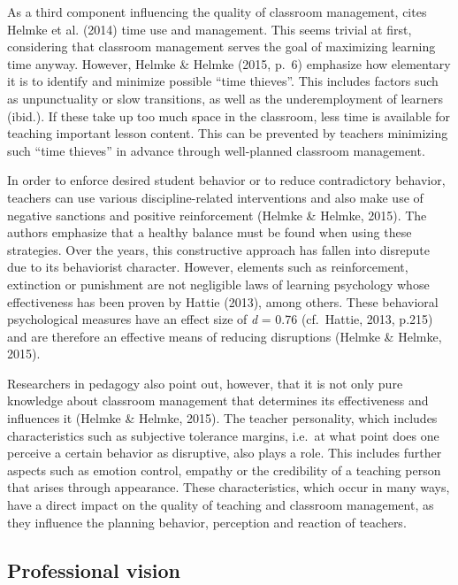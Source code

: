\documentclass[
  man]{apa6}
\begin{document}
As a third component influencing the quality of classroom management, cites Helmke et al. (2014) time use and management. This seems trivial at first, considering that classroom management serves the goal of maximizing learning time anyway. However, Helmke \& Helmke (2015, p.~6) emphasize how elementary it is to identify and minimize possible ``time thieves''. This includes factors such as unpunctuality or slow transitions, as well as the underemployment of learners (ibid.). If these take up too much space in the classroom, less time is available for teaching important lesson content. This can be prevented by teachers minimizing such ``time thieves'' in advance through well-planned classroom management.

In order to enforce desired student behavior or to reduce contradictory behavior, teachers can use various discipline-related interventions and also make use of negative sanctions and positive reinforcement (Helmke \& Helmke, 2015). The authors emphasize that a healthy balance must be found when using these strategies. Over the years, this constructive approach has fallen into disrepute due to its behaviorist character. However, elements such as reinforcement, extinction or punishment are not negligible laws of learning psychology whose effectiveness has been proven by Hattie (2013), among others. These behavioral psychological measures have an effect size of \emph{d} = 0.76 (cf.~Hattie, 2013, p.215) and are therefore an effective means of reducing disruptions (Helmke \& Helmke, 2015).

Researchers in pedagogy also point out, however, that it is not only pure knowledge about classroom management that determines its effectiveness and influences it (Helmke \& Helmke, 2015). The teacher personality, which includes characteristics such as subjective tolerance margins, i.e.~at what point does one perceive a certain behavior as disruptive, also plays a role. This includes further aspects such as emotion control, empathy or the credibility of a teaching person that arises through appearance. These characteristics, which occur in many ways, have a direct impact on the quality of teaching and classroom management, as they influence the planning behavior, perception and reaction of teachers.

\subsection{Professional vision}\label{professional-vision}
\end{document}
